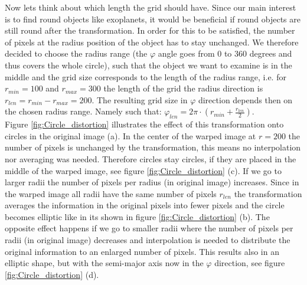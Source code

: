 Now lets think about which length the grid should have. Since our main interest is to find round objects like exoplanets, it would be beneficial if round objects are still round after the transformation. In order for this to be satisfied, the number of pixels at the radius position of the object has to stay unchanged. We therefore decided to choose the radius range (the $\varphi$ angle goes from $0$ to $360$ degrees and thus covers the whole circle), such that the object we want to examine is in the middle and the grid size corresponds to the length of the radius range, i.e. for $r_{min}=100$ and $r_{max}=300$ the length of the grid the radius direction is $r_{len}=r_{min}-r_{max}=200$. The resulting grid size in $\varphi$ direction depends then on the chosen radius range. Namely such that: $\varphi_{len} = 2\pi \cdot (r_{min}+\frac{r_{len}}{2})$.\\
Figure \ref{fig:Circle_distortion} illustrates the effect of this transformation onto circles in the original image (a). In the center of the warped image at $r=200$ the number of pixels is unchanged by the transformation, this means no interpolation nor averaging was needed. Therefore circles stay circles, if they are placed in the middle of the warped image, see figure \ref{fig:Circle_distortion} (c). If we go to larger radii the number of pixels per radius (in original image) increases. Since in the warped image all radii have the same number of pixels $r_{len}$ the transformation averages the information in the original pixels into fewer pixels and the circle becomes elliptic like in its shown in figure \ref{fig:Circle_distortion} (b). The opposite effect happens if we go to smaller radii where the number of pixels per radii (in original image) decreases and interpolation is needed to distribute the original information to an enlarged number of pixels. This results also in an elliptic shape, but with the semi-major axis now in the $\varphi$ direction, see figure \ref{fig:Circle_distortion} (d). 
